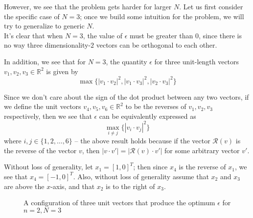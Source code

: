 \documentclass[11pt,letterpaper,twoside,english]{article}
\theoremstyle{theorem}
\theoremstyle{remark}
\begin{document}
However, we see that the problem gets harder for larger $N$. Let us first consider the specific case of $N=3$; once we build some intuition for the problem, we will try to generalize to generic $N$.
\\

It's clear that when $N=3$, the value of $\epsilon$ must be greater than $0$, since there is no way three dimensionality-$2$ vectors can be orthogonal to each other.

In addition, we see that for $N=3$, the quantity $\epsilon$ for three unit-length vectors $v_1, v_2, v_3 \in \mathbb{R}^2$ is given by $$\max \{ |v_1 \cdot v_2|^2, |v_1 \cdot v_3|^2, |v_2 \cdot v_3|^2 \}$$

Since we don't care about the sign of the dot product between any two vectors, if we define the unit vectors $v_4, v_5, v_6 \in \mathbb{R}^2$ to be the reverses of $v_1, v_2, v_3$ respectively, then we see that $\epsilon$ can be equivalently expressed as $$\max_{i \neq j} \{|v_i \cdot v_j |^2 \}$$
where $i, j \in \{1,2,\ldots,6\}$ -- the above result holds because if the vector $\mathcal{R}(v)$ is the reverse of the vector $v$, then $|v \cdot v'| = |\mathcal{R}(v) \cdot v'|$ for some arbitrary vector $v'$.

Without loss of generality, let $x_1 = [1, 0]^T$; then since $x_4$ is the reverse of $x_1$, we see that $x_4 = [-1, 0]^T$. Also, without loss of generality assume that $x_2$ and $x_3$ are above the $x$-axis, and that $x_2$ is to the right of $x_3$.

\begin{figure}[!h]
    \centering
    \caption{A configuration of three unit vectors that produce the optimum $\epsilon$ for $n=2, N=3$}
\end{figure}
\end{document}
